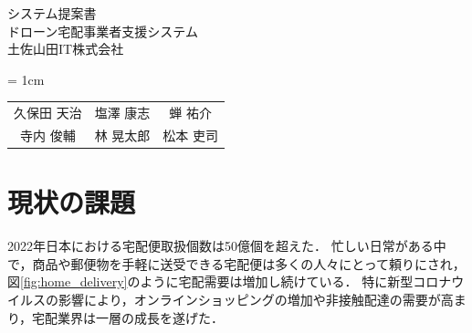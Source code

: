 \documentclass[a4paper, titlepage]{jsarticle}
\date{\today}
\begin{document}
\begin{titlepage}
  \centering
  \vspace*{150truept}
  {\Large システム提案書}\\
  \vspace*{50truept}
  {\Huge ドローン宅配事業者支援システム} \\
  \vspace{100truept}
  {\LARGE 土佐山田IT株式会社}\\
  \vspace{20truept}
  {\large{\tabcolsep = 1cm
    \begin{tabular}{ccc}
      久保田 天治 & 塩澤 康志 & 蝉 祐介 \\
      寺内 俊輔 & 林 晃太郎 & 松本 吏司
    \end{tabular}
  }}
\end{titlepage}

\tableofcontents

\clearpage

\section{現状の課題}
2022年日本における宅配便取扱個数は50億個を超えた．
忙しい日常がある中で，商品や郵便物を手軽に送受できる宅配便は多くの人々にとって頼りにされ，図\ref{fig:home_delivery}のように宅配需要は増加し続けている．
特に新型コロナウイルスの影響により，オンラインショッピングの増加や非接触配達の需要が高まり，宅配業界は一層の成長を遂げた．
\end{document}
